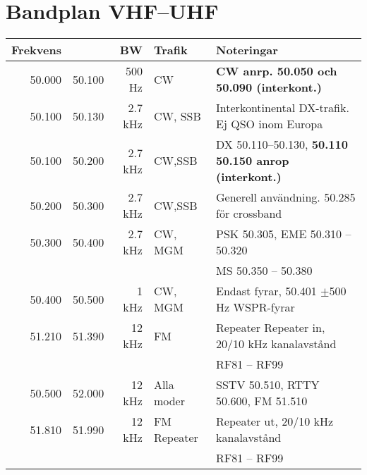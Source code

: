 \section{Bandplan VHF--UHF}

\begin{tabular}{rrrll}
	
	\textbf{Frekvens} &  & \textbf{BW} & \textbf{Trafik} & \textbf{Noteringar} \\ \hline
	
	50.000 & 50.100 & 500 Hz  & CW          & \textbf{CW anrp. 50.050 och 50.090 (interkont.)}             \\ \hline
	50.100 & 50.130 & 2.7 kHz & CW, SSB     & Interkontinental DX-trafik. Ej QSO inom Europa               \\ \hline
	50.100 & 50.200 & 2.7 kHz & CW,SSB      & DX 50.110--50.130, \textbf{50.110 50.150 anrop (interkont.)} \\ \hline
	50.200 & 50.300 & 2.7 kHz & CW,SSB      & Generell användning. 50.285 för crossband                    \\ \hline
	50.300 & 50.400 & 2.7 kHz & CW, MGM     & PSK 50.305, EME 50.310 – 50.320                              \\
	&        &         &             & MS 50.350 – 50.380                                           \\ \hline
	50.400 & 50.500 & 1 kHz   & CW, MGM     & Endast fyrar, 50.401 $\pm$500 Hz WSPR-fyrar                      \\ \hline
	51.210 & 51.390 & 12 kHz  & FM          & Repeater Repeater in, 20/10 kHz kanalavstånd                 \\
	&        &         &             & RF81 – RF99                                                  \\ \hline
	50.500 & 52.000 & 12 kHz  & Alla moder  & SSTV 50.510, RTTY 50.600, FM 51.510                          \\ \hline
	51.810 & 51.990 & 12 kHz  & FM Repeater & Repeater ut, 20/10 kHz kanalavstånd                          \\
	&        &         &             & RF81 – RF99                                                  \\ \hline
\end{tabular}

